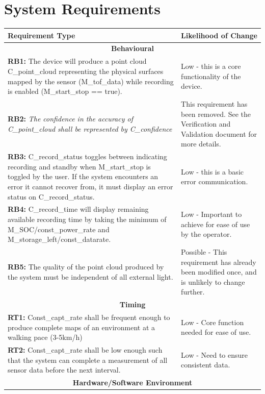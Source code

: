 \documentclass[11pt]{article}
\begin{document}
	\section{System Requirements}
		\begin{tabularx}{\textwidth}{X p{}}
			\toprule
			\textbf{Requirement Type} & \textbf{Likelihood of Change}\\
			\toprule
			\multicolumn{2}{c}{\textbf{Behavioural}} \\
			\toprule
			\textbf{RB1:} The device will produce a point cloud C\_point\_cloud representing the physical surfaces mapped by the sensor (M\_tof\_data) while recording is enabled (M\_start\_stop == true).  & Low - this is a core functionality of the device. \\
			\midrule
			\textbf{RB2:} \textit{The confidence in the accuracy of C\_point\_cloud shall be represented by C\_confidence}  &  This requirement has been removed. See the Verification and Validation document for more details. \\
			\midrule
			\textbf{RB3:} C\_record\_status toggles between indicating recording and standby when M\_start\_stop is toggled by the user. If the system encounters an error it cannot recover from, it must display an error status on C\_record\_status.  & Low - this is a basic error communication. \\
			\midrule
			\textbf{RB4:} C\_record\_time will display remaining available recording time by taking the minimum of M\_SOC/const\_power\_rate and M\_storage\_left/const\_datarate.  &  Low - Important to achieve for ease of use by the operator. \\
			\midrule
			\textbf{RB5:} The quality of the point cloud produced by the system must be independent of all external light.  &  Possible - This requirement has already been modified once, and is unlikely to change further. \\
			\toprule
			\multicolumn{2}{c}{\textbf{Timing}} \\
			\toprule
			\textbf{RT1:} Const\_capt\_rate shall be frequent enough to produce complete maps of an environment at a walking pace (3-5km/h)  & Low - Core function needed for ease of use. \\
			\midrule
			\textbf{RT2:} Const\_capt\_rate shall be low enough such that the system can complete a measurement of all sensor data before the next interval.  & Low - Need to ensure consistent data.\\
			\toprule
			\multicolumn{2}{c}{\textbf{Hardware/Software Environment}} \\

\end{tabularx}
\end{document}
